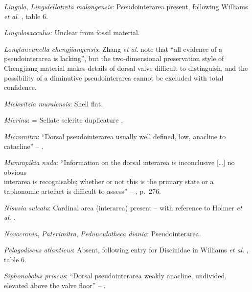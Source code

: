 \documentclass[openany]{book}
\theoremstyle{definition}
\theoremstyle{definition}
\theoremstyle{definition}
\theoremstyle{remark}
\begin{document}
\hypertarget{Lingula-coding-24}{}
\emph{Lingula}, \emph{Lingulellotreta malongensis}: Pseudointerarea
present, following Williams \emph{et al}.
\citeyearpar{Williams2000LinguliformeaCraniiformea}, table 6.

\hypertarget{Lingulosacculus-coding-24}{}
\emph{Lingulosacculus}: Unclear from fossil material.

\hypertarget{Longtancunella_chengjiangensis-coding-24}{}
\emph{Longtancunella chengjiangensis}: Zhang \emph{et al}.
\citeyearpar{Zhang2011Theexceptionally} note that ``all evidence of a
pseudointerarea is lacking'', but the two-dimensional preservation style
of Chengjiang material makes details of dorsal valve difficult to
distinguish, and the possibility of a diminutive pseudointerarea cannot
be excluded with total confidence.

\hypertarget{Mickwitzia_muralensis-coding-24}{}
\emph{Mickwitzia muralensis}: Shell flat.

\hypertarget{Micrina-coding-24}{}
\emph{Micrina}: = Sellate sclerite duplicature
\citep{Holmer2008TheEarly}.

\hypertarget{Micromitra-coding-24}{}
\emph{Micromitra}: ``Dorsal pseudointerarea usually well defined, low,
anacline to catacline'' --
\citet{Williams2000LinguliformeaCraniiformea}.

\hypertarget{Mummpikia_nuda-coding-24}{}
\emph{Mummpikia nuda}: ``Information on the dorsal interarea is
inconclusive {[}\ldots{}{]} no obvious\\
interarea is recognisable; whether or not this is the primary state or a
taphonomic artefact is difficult to assess'' --
\citet{Balthasar2008iMummpikia}, p.~276.

\hypertarget{Nisusia_sulcata-coding-24}{}
\emph{Nisusia sulcata}: Cardinal area (interarea) present -- with
reference to Holmer \emph{et al}.
\citeyearpar{Holmer2018Evolutionarysignificance}.

\hypertarget{Novocrania-coding-24}{}
\emph{Novocrania}, \emph{Paterimitra}, \emph{Pedunculotheca diania}:
Pseudointerarea.

\hypertarget{Pelagodiscus_atlanticus-coding-24}{}
\emph{Pelagodiscus atlanticus}: Absent, following entry for Discinidae
in Williams \emph{et al}.
\citeyearpar{Williams2000LinguliformeaCraniiformea}, table 6.

\hypertarget{Siphonobolus_priscus-coding-24}{}
\emph{Siphonobolus priscus}: ``Dorsal pseudointerarea weakly anacline,
undivided, elevated above the valve floor'' --
\citet{Popov2009Earlyontogeny}.
\end{document}
